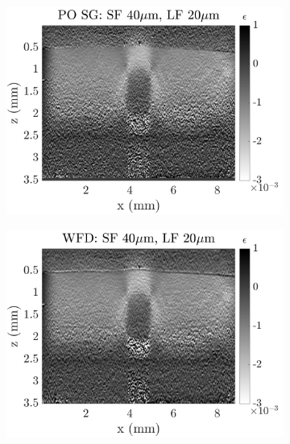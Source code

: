 \begin{figure}[h]
\begin{subfigure}{0.49\textwidth}
        \includegraphics[width=\textwidth]{appendix_figs/posg_fr40_lr20.png}
    \end{subfigure}
    \begin{subfigure}{0.49\textwidth}
    	\centering
        \includegraphics[width=\textwidth]{appendix_figs/wfd_fr40_lr20.png}
    \end{subfigure}
    \\
    \begin{subfigure}{0.49\textwidth}
    	\centering

\end{subfigure}
\end{figure}
